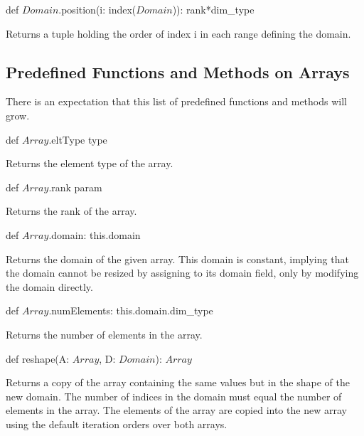 \begin{protohead}
def $Domain$.position(i: index($Domain$)): rank*dim_type
\end{protohead}
\begin{protobody}
Returns a tuple holding the order of index i in each range defining
the domain.
\end{protobody}


\subsection{Predefined Functions and Methods on Arrays}

There is an expectation that this list of predefined functions and
methods will grow.

\begin{protohead}
def $Array$.eltType type
\end{protohead}
\begin{protobody}
Returns the element type of the array.
\end{protobody}

\begin{protohead}
def $Array$.rank param
\end{protohead}
\begin{protobody}
Returns the rank of the array.
\end{protobody}

\begin{protohead}
def $Array$.domain: this.domain
\end{protohead}
\begin{protobody}
Returns the domain of the given array.  This domain is constant,
implying that the domain cannot be resized by assigning to its domain
field, only by modifying the domain directly.
\end{protobody}

\begin{protohead}
def $Array$.numElements: this.domain.dim_type
\end{protohead}
\begin{protobody}
Returns the number of elements in the array.
\end{protobody}

\begin{protohead}
def reshape(A: $Array$, D: $Domain$): $Array$
\end{protohead}
\begin{protobody}
Returns a copy of the array containing the same values but in the
shape of the new domain.  The number of indices in the domain must
equal the number of elements in the array.  The elements of the array
are copied into the new array using the default iteration orders over
both arrays.
\end{protobody}
